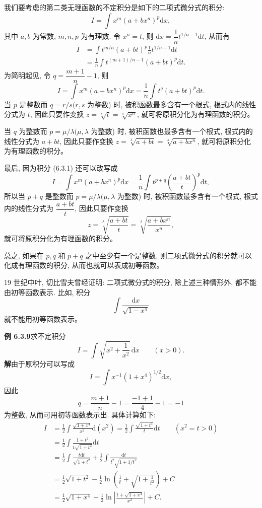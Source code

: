 \documentclass[UTF8,12pt,a4paper,fontset=fandol]{ctexart}
\begin{document}
我们要考虑的第二类无理函数的不定积分是如下的二项式微分式的积分:
\[
  I=\int x^m(a+bx^n)^p\mathrm dx,
\]
其中 $a,b$ 为常数, $m,n,p$ 为有理数. 令 $x^n=t$, 则 $\mathrm dx=\dfrac1n t^{1/n-1}\mathrm dt$, 从而有
\[
\begin{aligned}
  I
  &=
  \int t^{m/n}(a+bt)^p\frac1n t^{1/n-1}\mathrm dt\\
  &=
  \frac1n\int t^{(m+1)/n-1}(a+bt)^p\mathrm dt.
\end{aligned}
\]
为简明起见, 令 $q=\dfrac{m+1}n-1$, 则
\begin{equation}
  I=\int x^m(a+bx^n)^p\mathrm dx
  =
  \frac1n\int t^q(a+bt)^p\mathrm dt.
  \tag{6.3.1}
\end{equation}
当 $p$ 是整数而 $q=r/s(r,s$ 为整数) 时, 被积函数最多含有一个根式, 根式内的线性分式为 $t$, 因此只要作变换 $z=\sqrt[s]{t}=\sqrt[s]{x^n}$, 就可将原积分化为有理函数的积分。

当 $q$ 为整数而 $p=\mu/\lambda(\mu,\lambda$ 为整数) 时, 被积函数也最多含有一个根式, 根式内的线性分式为 $a+bt$, 因此只要作变换 $z=\sqrt[\lambda]{a+bt}=\sqrt[\lambda]{a+bx^n}$, 就可将原积分化为有理函数的积分。

最后, 因为积分 (6.3.1) 还可以改写成
\[
  I=\int x^m(a+bx^n)^p\mathrm dx
  =
  \frac1n\int t^{p+q}\left(\frac{a+bt}{t}\right)^p\mathrm dt,
\]
所以当 $p+q$ 是整数而 $p=\mu/\lambda(\mu,\lambda$ 为整数) 时, 被积函数最多含有一个根式, 根式内的线性分式为 $\dfrac{a+bt}{t}$, 因此只要作变换
\[
  z=\sqrt[\lambda]{\frac{a+bt}{t}}
  =
  \sqrt[\lambda]{\frac{a+bx^n}{x^n}},
\]
就可将原积分化为有理函数的积分。

总之, 如果在 $p,q$ 和 $p+q$ 之中至少有一个是整数, 则二项式微分式的积分就可以化成有理函数的积分, 从而也就可以表成初等函数。

19 世纪中叶, 切比雪夫曾经证明: 二项式微分式的积分, 除上述三种情形外, 都不能由初等函数表示. 比如, 积分
\[
  \int\frac{\mathrm dx}{\sqrt{1-x^4}}
\]
就不能用初等函数表示。

\noindent\textbf{例 6.3.9}\quad 求不定积分
\[
  I=\int\sqrt{x^2+\frac1{x^2}}\,\mathrm dx\qquad(x>0).
\]
\noindent\textbf{解}\quad 由于原积分可以写成
\[
  I=\int x^{-1}(1+x^4)^{1/2}\mathrm dx,
\]
因此
\[
  q=\frac{m+1}n-1=\frac{-1+1}4-1=-1
\]
为整数, 从而可用初等函数表示出. 具体计算如下:
\[
\begin{aligned}
  I
  &=
  \frac12\int\frac{\sqrt{1+x^4}}{x^2}\mathrm d(x^2)
  =
  \frac12\int\frac{\sqrt{1+t^2}}{t}\mathrm dt
  \qquad(x^2=t>0)\\
  &=
  \frac12\int\frac{1+t^2}{t\sqrt{1+t^2}}\mathrm dt\\
  &=
  \frac12\int\frac{t\mathrm dt}{\sqrt{1+t^2}}
  +\frac12\int\frac{\mathrm dt}{t^2\sqrt{1+1/t^2}}\\
  &=
  \frac12\sqrt{1+t^2}-\frac12\ln\left(\frac1t+\sqrt{1+\frac1{t^2}}\right)+C\\
  &=
  \frac12\sqrt{1+x^4}
  -\frac12\ln\left|\frac{1+\sqrt{1+x^4}}{x^2}\right|+C.
\end{aligned}
\]
\end{document}

